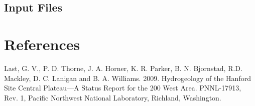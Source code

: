 \documentclass[12pt]{article}
\begin{document}
\subsection{Input Files}

\section{References}

Last, G. V., P. D. Thorne, J. A. Horner, K. R. Parker, B. N. Bjornstad, R.D. Mackley, D. C. Lanigan and B. A. Williams. 2009. Hydrogeology of the Hanford Site Central Plateau---A Status Report for the 200 West Area. PNNL-17913, Rev. 1, Pacific Northwest National Laboratory, Richland, Washington.
\end{document}
